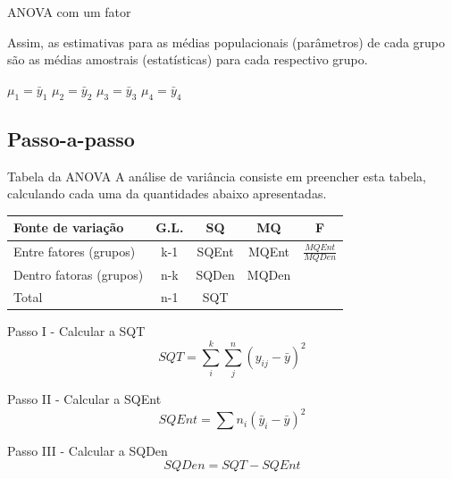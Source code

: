 \documentclass{bredelebeamer}
\begin{document}
\begin{frame}
\begin{block}{ANOVA com um fator}
\vspace{.2cm}

Assim, as estimativas para as médias populacionais (parâmetros) de cada
grupo são as médias amostrais (estatísticas) para cada respectivo grupo.

\begin{center}
$\mu_{1} = \bar{y}_{1}$ \hspace{.2cm} $\mu_{2} = \bar{y}_{2}$ \hspace{.2cm}
$\mu_{3} = \bar{y}_{3}$ \hspace{.2cm} $\mu_{4} = \bar{y}_{4}$
\end{center}

\end{block}
\end{frame}

\subsection{Passo-a-passo}

\begin{frame}
\begin{exampleblock}{Tabela da ANOVA}
A análise de variância consiste em preencher esta tabela, calculando
cada uma da quantidades abaixo apresentadas.

\begin{table}
\begin{center}
\begin{tabular}{lcccc}
\hline\hline
Fonte de variação & G.L. & SQ & MQ & F \\  
\hline
Entre fatores (grupos) & k-1 & SQEnt & MQEnt & $\frac{MQEnt}{MQDen}$ \\
Dentro fatoras (grupos) & n-k & SQDen & MQDen &  \\ \hline
Total & n-1 & SQT &  & \\ 
\hline\hline
\end{tabular}
\end{center}
\end{table}

\end{exampleblock}
\end{frame}

\begin{frame}
\begin{block}{Passo I - Calcular a SQT}
\[
SQT = \sum \limits_{i}^{k}\sum \limits_{j}^{n}(y_{ij} - \bar{y})^{2}
\]
\end{block}

\pause
\begin{block}{Passo II - Calcular a SQEnt}
\[
SQEnt = \sum{n_{i}(\bar{y}_{i} - \bar{y})^{2}}
\]
\end{block}

\pause
\begin{block}{Passo III - Calcular a SQDen}
\[
SQDen = SQT - SQEnt
\]
\end{block}
\end{frame}
\end{document}
